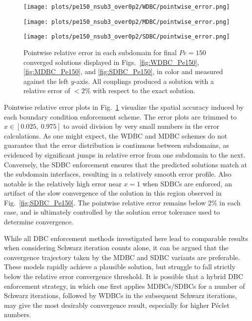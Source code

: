 \documentclass[oneside,final]{csri23}
\begin{document}
\begin{figure}
    \begin{minipage}{0.49\linewidth}
        \centering
        \texttt{[image: plots/pe150\_nsub3\_over0p2/WDBC/pointwise\_error.png]}
    \end{minipage}
    \begin{minipage}{0.49\linewidth}
        \texttt{[image: plots/pe150\_nsub3\_over0p2/MDBC/pointwise\_error.png]}
    \end{minipage}

    \centering
    \begin{minipage}{0.49\linewidth}
        \texttt{[image: plots/pe150\_nsub3\_over0p2/SDBC/pointwise\_error.png]}
    \end{minipage}
    \caption{Pointwise relative error in each subdomain for final $Pe = 150$ converged solutions displayed in Figs.~\ref{fig:WDBC_Pe150}, \ref{fig:MDBC_Pe150}, and \ref{fig:SDBC_Pe150}, in color and measured against the left $y$-axis. All couplings produced a solution with a relative error of $<2\%$ with respect to the exact solution.%
    }
    \label{fig:pointwise_error}
\end{figure}

Pointwise relative error plots in Fig.~\ref{fig:pointwise_error} visualize the spatial accuracy induced by each boundary condition enforcement scheme. The error plots are trimmed to $x \in [0.025, \ 0.975]$ to avoid division by very small numbers in the error calculations. As one might expect, the WDBC and MDBC schemes do not guarantee that the error distribution is continuous between subdomains, as evidenced by significant jumps in relative error from one subdomain to the next. Conversely, the SDBC enforcement ensures that the predicted solutions match at the subdomain interfaces, resulting in a relatively smooth error profile. Also notable is the relatively high error near $x = 1$ when SDBCs are enforced, an artifact of the slow convergence of the solution in this region observed in Fig.~\ref{fig:SDBC_Pe150}. The pointwise relative error remains below 2\% in each case, and is ultimately controlled by the solution error tolerance used to determine convergence.

While all DBC enforcement methods investigated here lead to comparable results when considering Schwarz iteration counts alone, it can be argued that the convergence trajectory taken by the MDBC and SDBC variants are preferable. These models rapidly achieve a plausible solution, but struggle to fall strictly below the relative error convergence threshold. It is possible that a hybrid DBC enforcement strategy, in which one first applies MDBCs/SDBCs for a number of Schwarz iterations, followed by WDBCs in the subsequent Schwarz iterations, may give the most desirably convergence result, especially for higher P\'{e}clet numbers. 
\end{document}
